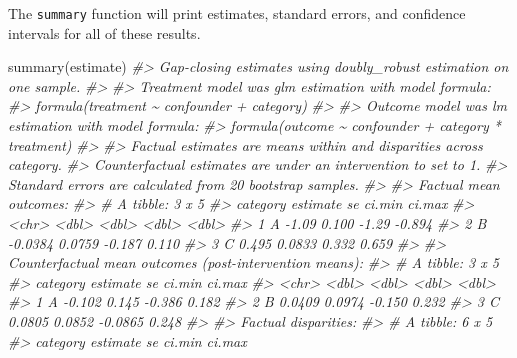 \documentclass[
]{article}
\newenvironment{Shaded}{\begin{snugshade}}{\end{snugshade}}
\newcommand{\CommentTok}[1]{\textcolor[rgb]{0.56,0.35,0.01}{\textit{#1}}}
\newcommand{\FunctionTok}[1]{\textcolor[rgb]{0.00,0.00,0.00}{#1}}
\newcommand{\NormalTok}[1]{#1}
\begin{document}
The \texttt{summary} function will print estimates, standard errors, and confidence intervals for all of these results.

\begin{Shaded}
\begin{Highlighting}[]
\FunctionTok{summary}\NormalTok{(estimate)}
\CommentTok{\#\textgreater{} Gap{-}closing estimates using doubly\_robust estimation on one sample.}
\CommentTok{\#\textgreater{} }
\CommentTok{\#\textgreater{} Treatment model was glm estimation with model formula:}
\CommentTok{\#\textgreater{} formula(treatment \textasciitilde{} confounder + category)}
\CommentTok{\#\textgreater{} }
\CommentTok{\#\textgreater{} Outcome model was lm estimation with model formula:}
\CommentTok{\#\textgreater{} formula(outcome \textasciitilde{} confounder + category * treatment)}
\CommentTok{\#\textgreater{} }
\CommentTok{\#\textgreater{} Factual estimates are means within and disparities across category.}
\CommentTok{\#\textgreater{} Counterfactual estimates are under an intervention to set  to 1.}
\CommentTok{\#\textgreater{} Standard errors are calculated from 20 bootstrap samples.}
\CommentTok{\#\textgreater{} }
\CommentTok{\#\textgreater{} Factual mean outcomes:}
\CommentTok{\#\textgreater{} \# A tibble: 3 x 5}
\CommentTok{\#\textgreater{}   category estimate     se ci.min ci.max}
\CommentTok{\#\textgreater{}   \textless{}chr\textgreater{}       \textless{}dbl\textgreater{}  \textless{}dbl\textgreater{}  \textless{}dbl\textgreater{}  \textless{}dbl\textgreater{}}
\CommentTok{\#\textgreater{} 1 A         {-}1.09   0.100  {-}1.29  {-}0.894}
\CommentTok{\#\textgreater{} 2 B         {-}0.0384 0.0759 {-}0.187  0.110}
\CommentTok{\#\textgreater{} 3 C          0.495  0.0833  0.332  0.659}
\CommentTok{\#\textgreater{} }
\CommentTok{\#\textgreater{} Counterfactual mean outcomes (post{-}intervention means):}
\CommentTok{\#\textgreater{} \# A tibble: 3 x 5}
\CommentTok{\#\textgreater{}   category estimate     se  ci.min ci.max}
\CommentTok{\#\textgreater{}   \textless{}chr\textgreater{}       \textless{}dbl\textgreater{}  \textless{}dbl\textgreater{}   \textless{}dbl\textgreater{}  \textless{}dbl\textgreater{}}
\CommentTok{\#\textgreater{} 1 A         {-}0.102  0.145  {-}0.386   0.182}
\CommentTok{\#\textgreater{} 2 B          0.0409 0.0974 {-}0.150   0.232}
\CommentTok{\#\textgreater{} 3 C          0.0805 0.0852 {-}0.0865  0.248}
\CommentTok{\#\textgreater{} }
\CommentTok{\#\textgreater{} Factual disparities:}
\CommentTok{\#\textgreater{} \# A tibble: 6 x 5}
\CommentTok{\#\textgreater{}   category estimate    se ci.min ci.max}

\end{Highlighting}
\end{Shaded}
\end{document}
